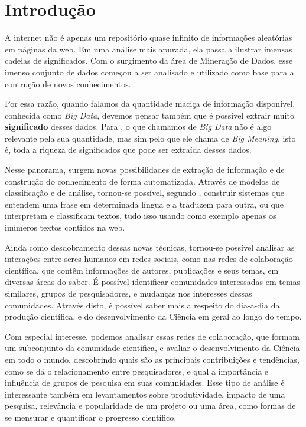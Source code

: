\chapter{Introdução}
\label{cap:introducao}

A internet não é apenas um repositório quase infinito de informações aleatórias em páginas da web. Em uma análise mais apurada, ela passa a ilustrar imensas cadeias de significados. Com o surgimento da área de Mineração de Dados, esse imenso conjunto de dados começou a ser analisado e utilizado como base para a contrução de novos conhecimentos.

Por essa razão, quando falamos da quantidade maciça de informação disponível, conhecida como \textit{Big Data}, devemos pensar também que é possível extrair muito \textbf{significado} desses dados. Para \cite{Kay2014}, o que chamamos de \textit{Big Data} não é algo relevante pela sua quantidade, mas sim pelo que ele chama de \textit{Big Meaning}, isto é, toda a riqueza de significados que pode ser extraída desses dados.

Nesse panorama, surgem novas possibilidades de extração de informação e de construção do conhecimento de forma automatizada. Através de modelos de classificação e de análise, tornou-se possível, segundo \cite{Halevy2009}, construir sistemas que entendem uma frase em determinada língua e a traduzem para outra, ou que interpretam e classificam textos, tudo isso usando como exemplo apenas os inúmeros textos contidos na web.

Ainda como desdobramento dessas novas técnicas, tornou-se possível analisar as interações entre seres humanos em redes sociais, como nas redes de colaboração científica, que contêm informações de autores, publicações e seus temas, em diversas áreas do saber. É possível identificar comunidades interessadas em temas similares, grupos de pesquisadores, e mudanças  nos interesses dessas comunidades. Através disto, é possível saber mais a respeito do dia-a-dia da produção científica, e do desenvolvimento da Ciência em geral ao longo do tempo.

Com especial interesse, podemos analisar essas redes de colaboração, que formam um subconjunto da comunidade científica, e avaliar o desenvolvimento da Ciência em todo o mundo, descobrindo quais são as principais contribuições e tendências, como se dá o relacionamento entre pesquisadores, e qual a importância e influência de grupos de pesquisa em suas comunidades. Esse tipo de análise é interessante também em levantamentos sobre produtividade, impacto de uma pesquisa, relevância e popularidade de um projeto ou uma área, como formas de se mensurar e quantificar o progresso científico.

